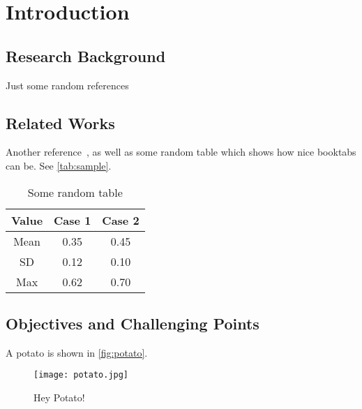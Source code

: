 \chapter{Introduction}\label{chp:intro}
\minitoc

\section{Research Background}\label{sec:bg}
Just some random references~\cite{bib:dalal,bib:ozuysal}

\section{Related Works}\label{sec:lit}
\blindtext[4]

Another reference~\cite{bib:benfold}, as well as some random table which shows how nice booktabs can be. See \autoref{tab:sample}.

\begin{table}
	\centering
	\caption{Some random table}
	\label{tab:sample}
	\begin{tabular}{c c c}
		\toprule
		Value		& Case 1		& Case 2	\\\midrule
		Mean		& 0.35			& 0.45		\\
		SD			& 0.12			& 0.10		\\
		Max			& 0.62			& 0.70		\\\bottomrule
	\end{tabular}
\end{table}

\section{Objectives and Challenging Points}\label{sec:obj}
A potato is shown in \autoref{fig:potato}.
\begin{figure}
	\centering
	\texttt{[image: potato.jpg]}
	\caption{Hey Potato!}
	\label{fig:potato}
\end{figure}

\blindmathpaper